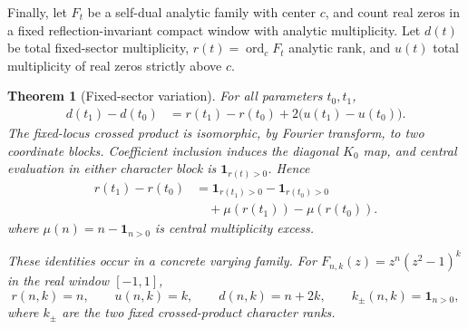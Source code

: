 \documentclass[11pt,reqno]{amsart}
\newtheorem{theorem}{Theorem}[section]
\newcommand{\ord}{\operatorname{ord}}
\begin{document}
Finally, let $F_t$ be a self-dual analytic family with center $c$, and count real zeros in a fixed
reflection-invariant compact window with analytic multiplicity.  Let $d(t)$ be total fixed-sector
multiplicity, $r(t)=\ord_c F_t$ analytic rank, and $u(t)$ total multiplicity of real zeros strictly
above $c$.

\begin{theorem}[Fixed-sector variation]\label{thm:p4}
For all parameters $t_0,t_1$,
\[
 \begin{aligned}
 d(t_1)-d(t_0)
   &=r(t_1)-r(t_0)+2\bigl(u(t_1)-u(t_0)\bigr).
 \end{aligned}                                      \tag{1.19}
\]
The fixed-locus crossed product is isomorphic, by Fourier transform, to two coordinate blocks.  Coefficient
inclusion induces the diagonal $K_0$ map, and central evaluation in either character block is
$\mathbf1_{r(t)>0}$.  Hence
\[
 \begin{aligned}
 r(t_1)-r(t_0)
   &=\mathbf1_{r(t_1)>0}-\mathbf1_{r(t_0)>0}\\
   &\quad+\mu(r(t_1))-\mu(r(t_0)).
 \end{aligned}                                      \tag{1.20}
\]
where $\mu(n)=n-\mathbf1_{n>0}$ is central multiplicity excess.

These identities occur in a concrete varying family.  For
$F_{n,k}(z)=z^n(z^2-1)^k$ in the real window $[-1,1]$,
\[
 r(n,k)=n,\qquad u(n,k)=k,\qquad d(n,k)=n+2k,\qquad
 k_\pm(n,k)=\mathbf1_{n>0},                          \tag{1.21}
\]
where $k_\pm$ are the two fixed crossed-product character ranks.
\end{theorem}
\end{document}
